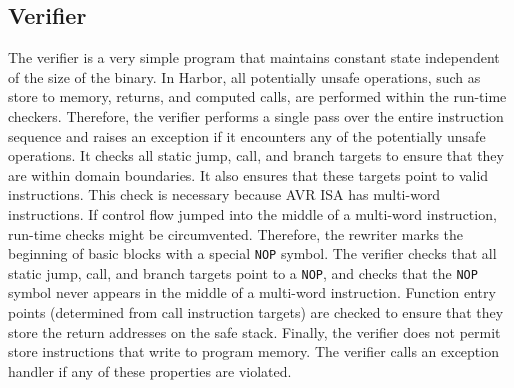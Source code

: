 \subsection{Verifier}
%
The verifier is a very simple program that maintains constant state
independent of the size of the binary.
%
In Harbor, all potentially unsafe operations, such as store to
memory, returns, and computed calls, are performed within the
run-time checkers.
%
Therefore, the verifier performs a single pass over the entire
instruction sequence and raises an exception if it encounters
any of the potentially unsafe operations. 
%
It checks all static jump, call, and branch targets to ensure that
they are within domain boundaries.
%
It also ensures that these targets point to valid instructions.
%
This check is necessary because AVR ISA has multi-word instructions.
%
If control flow jumped into the middle of a multi-word instruction,
run-time checks might be circumvented.
%
Therefore, the rewriter marks the beginning of basic blocks with a special
\texttt{NOP} symbol.
%
The verifier checks that all static jump, call, and branch targets
point to a \texttt{NOP}, and checks that the \texttt{NOP} symbol never
appears in the middle of a multi-word instruction.
%
% 
%
Function entry points (determined from call instruction targets) are
checked to ensure that they store the return addresses on the safe stack.
%
Finally, the verifier does not permit store instructions that write to
program memory.
%
The verifier calls an exception handler if any of these properties are violated.
%
%
